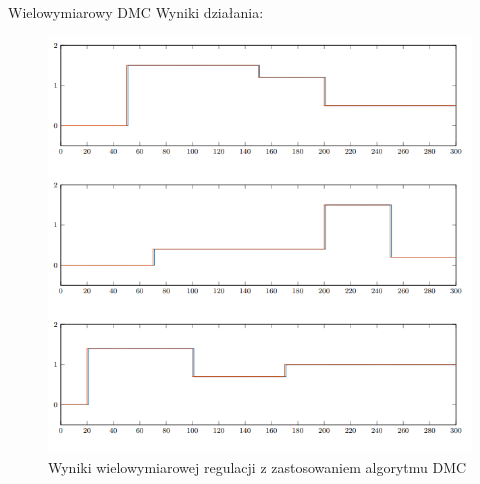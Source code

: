 \begin{frame}{Wielowymiarowy DMC}
Wyniki działania:
	\begin{center}
		\begin{figure}[H]
            		\includegraphics[scale=0.4]{images/wyniki_DMC.png} %
          			 \caption{Wyniki wielowymiarowej regulacji z zastosowaniem algorytmu DMC}
		\end{figure}
	\end{center}
\end{frame}
